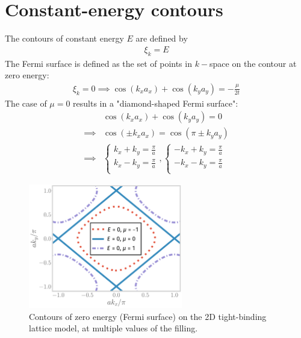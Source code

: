 \documentclass{article}
\begin{document}
\section{Constant-energy contours}
The contours of constant energy \(E\) are defined by
\begin{equation}\begin{aligned}
	\xi_k = E
\end{aligned}\end{equation}
The Fermi surface is defined as the set of points in $k-$space on the contour at zero energy:
\begin{equation}\begin{aligned}
	\xi_k = 0 \implies \cos(k_x a_x) + \cos(k_y a_y) = -\frac{\mu}{2t}
\end{aligned}\end{equation}
The case of \(\mu=0\) results in a "diamond-shaped Fermi surface":
\begin{equation}\begin{aligned}
	&\cos(k_x a_x) + \cos(k_y a_y) = 0\\
	\implies &\cos(\pm k_x a_x) = \cos(\pi \pm k_y a_y) \\
	\implies & \begin{cases}
		k_x + k_y = \frac{\pi}{a}\\
		k_x - k_y = \frac{\pi}{a}\\
	\end{cases},
	\begin{cases}
		-k_x + k_y = \frac{\pi}{a}\\
		-k_x - k_y = \frac{\pi}{a}\\
	\end{cases}
\end{aligned}\end{equation}
\begin{figure}[htpb]
	\centering
	\includegraphics[width=0.6\textwidth]{./tight-binding-contour.pdf}
	\caption{Contours of zero energy (Fermi surface) on the 2D tight-binding lattice model, at multiple values of the filling.}
\end{figure}
\end{document}
